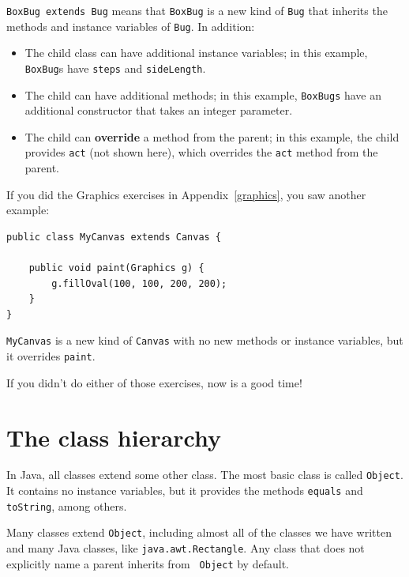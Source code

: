 \documentclass[12pt]{book}
\theoremstyle{exercise}
\begin{document}
{\tt BoxBug extends Bug} means that {\tt BoxBug} is a new
kind of {\tt Bug} that inherits the methods and instance
variables of {\tt Bug}.  In addition:

\begin{itemize}

\item The child class can have additional instance variables; in
this example, {\tt BoxBug}s have {\tt steps} and {\tt sideLength}.

\item The child can have additional methods; in this example,
{\tt BoxBugs} have an additional constructor that takes an integer
parameter.

\item The child can {\bf override} a method from the parent; in
this example, the child provides {\tt act} (not shown here),
which overrides the {\tt act} method from the parent.

\end{itemize}

If you did the Graphics exercises in Appendix~\ref{graphics}, you
saw another example:

\begin{lstlisting}
public class MyCanvas extends Canvas {

    public void paint(Graphics g) {
        g.fillOval(100, 100, 200, 200);
    }
}
\end{lstlisting}

{\tt MyCanvas} is a new kind of {\tt Canvas} with no new methods
or instance variables, but it overrides {\tt paint}.

If you didn't do either of those exercises, now is a good time!


\section{The class hierarchy}

In Java, all classes extend some other class.  The most basic class is
called {\tt Object}.  It contains no instance variables, but it
provides the methods {\tt equals} and {\tt toString}, among others.

Many classes extend {\tt Object}, including almost all of the classes
we have written and many Java classes, like {\tt java.awt.Rectangle}.
Any class that does not explicitly name a parent inherits from {\tt
  Object} by default.
\end{document}
